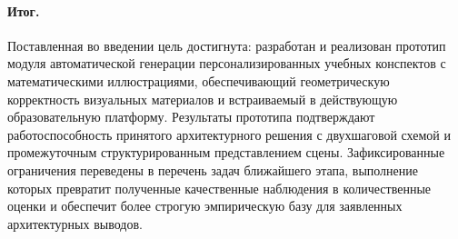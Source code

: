 \paragraph{Итог.}
Поставленная во введении цель достигнута: разработан и реализован
прототип модуля автоматической генерации персонализированных учебных
конспектов с математическими иллюстрациями, обеспечивающий геометрическую
корректность визуальных материалов и встраиваемый в действующую
образовательную платформу. Результаты прототипа подтверждают
работоспособность принятого архитектурного решения с двухшаговой схемой
и промежуточным структурированным представлением сцены.
Зафиксированные ограничения переведены в перечень задач ближайшего этапа,
выполнение которых превратит полученные качественные наблюдения в
количественные оценки и обеспечит более строгую эмпирическую базу для
заявленных архитектурных выводов.
